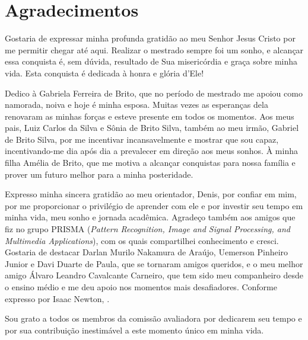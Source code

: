 \newpage
\thispagestyle{empty}
\section*{Agradecimentos}
Gostaria de expressar minha profunda gratidão ao meu Senhor Jesus Cristo por me permitir chegar até aqui. Realizar o mestrado sempre foi um sonho, e alcançar essa conquista é, sem dúvida, resultado de Sua misericórdia e graça sobre minha vida. Esta conquista é dedicada à honra e glória d'Ele!

Dedico à Gabriela Ferreira de Brito, que no período de mestrado me apoiou como namorada, noiva e hoje é minha esposa. Muitas vezes as esperanças dela renovaram as minhas forças e esteve presente em todos os momentos. Aos meus pais, Luiz Carlos da Silva e Sônia de Brito Silva, também ao meu irmão, Gabriel de Brito Silva, por me incentivar incansavelmente e mostrar que sou capaz, incentivando-me dia após dia a prevalecer em direção aos meus sonhos. À minha filha Amélia de Brito, que me motiva a alcançar conquistas para nossa família e prover um futuro melhor para a minha posteridade.

Expresso minha sincera gratidão ao meu orientador, Denis, por confiar em mim, por me proporcionar o privilégio de aprender com ele e por investir seu tempo em minha vida, meu sonho e jornada acadêmica. Agradeço também aos amigos que fiz no grupo PRISMA (\textit{Pattern Recognition, Image and Signal Processing, and Multimedia Applications}), com os quais compartilhei conhecimento e cresci. Gostaria de destacar Darlan Murilo Nakamura de Araújo, Uemerson Pinheiro Junior e Davi Duarte de Paula, que se tornaram amigos queridos, e o meu melhor amigo Álvaro Leandro Cavalcante Carneiro, que tem sido meu companheiro desde o ensino médio e me deu apoio nos momentos mais desafiadores. Conforme expresso por Isaac Newton, .

Sou grato a todos os membros da comissão avaliadora por dedicarem seu tempo e por sua contribuição inestimável a este momento único em minha vida.